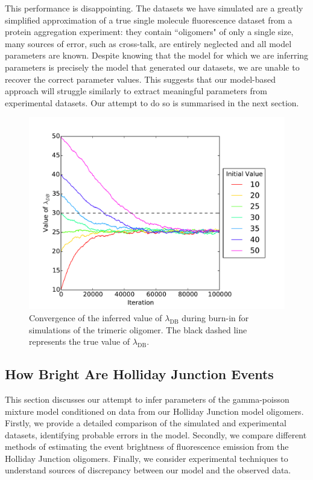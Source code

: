 This performance is disappointing. The datasets we have simulated are a greatly simplified approximation of a true single molecule fluorescence dataset from a protein aggregation experiment: they contain ``oligomers" of only a single size, many sources of error, such as cross-talk, are entirely neglected and all model parameters are known. Despite knowing that the model for which we are inferring parameters is precisely the model that generated our datasets, we are unable to recover the correct parameter values. This suggests that our model-based approach will struggle similarly to extract meaningful parameters from experimental datasets. Our attempt to do so is summarised in the next section.

\begin{figure}
   \begin{center}
      \includegraphics*[clip=true, width=6in]{sizing/Convergence.pdf}
      \caption{Convergence of the inferred value of $\lambda_{\text{DB}}$ during burn-in for simulations of the trimeric oligomer. The black dashed line represents the true value of $\lambda_{\text{DB}}$.}
      \label{fig:convergence}
   \end{center}
\end{figure}

\subsection{How Bright Are Holliday Junction Events}
This section discusses our attempt to infer parameters of the gamma-poisson mixture model conditioned on data from our Holliday Junction model oligomers. Firstly, we provide a detailed comparison of the simulated and experimental datasets, identifying probable errors in the model. Secondly, we compare different methods of estimating the event brightness of fluorescence emission from the Holliday Junction oligomers. Finally, we consider experimental techniques to understand sources of discrepancy between our model and the observed data.

